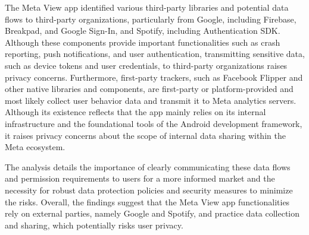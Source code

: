 The Meta View app identified various third-party libraries and potential data flows to third-party organizations, particularly from Google, including Firebase, Breakpad, and Google Sign-In, and Spotify, including Authentication SDK. Although these components provide important functionalities such as crash reporting, push notifications, and user authentication, transmitting sensitive data, such as device tokens and user credentials, to third-party organizations raises privacy concerns. Furthermore, first-party trackers, such as Facebook Flipper and other native libraries and components, are first-party or platform-provided and most likely collect user behavior data and transmit it to Meta analytics servers. Although its existence reflects that the app mainly relies on its internal infrastructure and the foundational tools of the Android development framework, it raises privacy concerns about the scope of internal data sharing within the Meta ecosystem.

The analysis details the importance of clearly communicating these data flows and permission requirements to users for a more informed market and the necessity for robust data protection policies and security measures to minimize the risks. Overall, the findings suggest that the Meta View app functionalities rely on external parties, namely Google and Spotify, and practice data collection and sharing, which potentially risks user privacy.